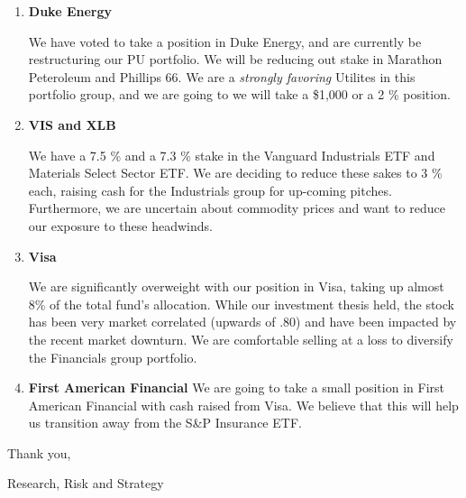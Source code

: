 \documentclass[11pt,pressrelease]{newlfm} %
\begin{document}
\begin{newlfm}


\vspace{-.50 in}
\begin{singlespace} %

\begin{enumerate}
\item \textbf{Duke Energy} \par
We have voted to take a position in Duke Energy, and are currently be restructuring our PU portfolio.  We will be reducing out stake in Marathon Peteroleum and Phillips 66.  We are a \textit{strongly favoring} Utilites in this portfolio group, and we are going to we will take a \$1,000 or a 2 \% position.  

\item  \textbf{VIS and XLB} \par
We have a 7.5 \% and a 7.3 \% stake in the Vanguard Industrials ETF and Materials Select Sector ETF.  We are deciding to reduce these sakes to 3 \% each, raising cash for the Industrials group for up-coming pitches.  Furthermore, we are uncertain about commodity prices and want to reduce our exposure to these headwinds.

\item \textbf{Visa} \par
We are significantly overweight with our position in Visa, taking up almost 8\% of the total fund's allocation.  While our investment thesis held, the stock has been very market correlated (upwards of .80) and have been impacted by the recent market downturn.  We are comfortable selling at a loss to diversify the Financials group portfolio.  

\item \textbf{First American Financial} We are going to take a small position in First American Financial with cash raised from Visa.  We believe that this will help us transition away from the S\&P Insurance ETF.  



\end{enumerate}

Thank you, \par
Research, Risk and Strategy


\end{singlespace} %




\end{newlfm}
\end{document}
